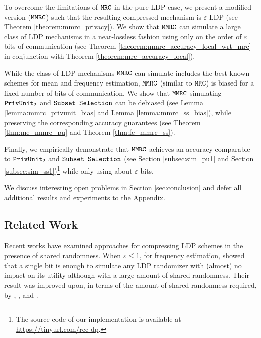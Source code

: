 To overcome the limitations of $\texttt{MRC}$ in the pure LDP case, we present a modified version ($\texttt{MMRC}$) such that the resulting compressed mechanism is $\varepsilon$-LDP (see Theorem \ref{theorem:mmrc_privacy}). We show that $\texttt{MMRC}$ can simulate a large class of LDP mechanisms in a near-lossless fashion using only on the order of $\varepsilon$ bits of communication (see Theorem \ref{theorem:mmrc_accuracy_local_wrt_mrc} in conjunction with Theorem \ref{theorem:mrc_accuracy_local}).

While the class of LDP mechanisms $\texttt{MMRC}$ can simulate includes the best-known schemes for mean and frequency estimation, $\texttt{MMRC}$ (similar to $\texttt{MRC}$) is biased for a fixed number of bits of communication. We show that $\texttt{MMRC}$ simulating $\texttt{PrivUnit}_2$ and $\texttt{Subset Selection}$ can be debiased (see Lemma \ref{lemma:mmrc_privunit_bias} and Lemma \ref{lemma:mmrc_ss_bias}), while preserving the corresponding accuracy guarantees (see Theorem \ref{thm:me_mmrc_pu} and Theorem \ref{thm:fe_mmrc_ss}).


Finally, we empirically demonstrate that $\texttt{MMRC}$ achieves an accuracy comparable to $\texttt{PrivUnit}_2$ and $\texttt{Subset Selection}$ (see Section \ref{subsec:sim_pu1} and Section \ref{subsec:sim_ss1})\footnote{The source code of our implementation is available at 
\url{https://tinyurl.com/rcc-dp}.} while only using about $\varepsilon$ bits.


We discuss interesting open problems in Section \ref{sec:conclusion} and defer all additional results and experiments to the Appendix. 


\subsection{Related Work}
\label{subsec:related_works}
Recent works have examined approaches for compressing LDP schemes in the presence of shared randomness. 
When $\varepsilon \leq 1$, for frequency estimation, \cite{BS15} showed that a single bit is enough to simulate any LDP randomizer with (almost) no impact on its utility although with a large amount of shared randomness. Their result was improved upon, in terms of the amount of shared randomness required, by \cite{bassily2017practical}, \cite{BNS19}, and \cite{acharya2019communication}.

